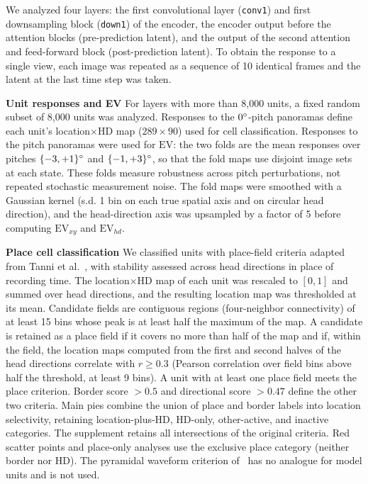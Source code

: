 \documentclass[11pt]{article}
\begin{document}
We analyzed four layers: the first convolutional layer (\texttt{conv1}) and first downsampling block (\texttt{down1}) of the encoder, the encoder output before the attention blocks (pre-prediction latent), and the output of the second attention and feed-forward block (post-prediction latent). To obtain the response to a single view, each image was repeated as a sequence of 10 identical frames and the latent at the last time step was taken.

{\bf Unit responses and EV}
For layers with more than 8,000 units, a fixed random subset of 8,000 units was analyzed. Responses to the $0\degree$-pitch panoramas define each unit's location$\times$HD map ($289\times90$) used for cell classification. Responses to the pitch panoramas were used for $\mathrm{EV}$: the two folds are the mean responses over pitches $\{-3,+1\}\degree$ and $\{-1,+3\}\degree$, so that the fold maps use disjoint image sets at each state. These folds measure robustness across pitch perturbations, not repeated stochastic measurement noise. The fold maps were smoothed with a Gaussian kernel (s.d. 1 bin on each true spatial axis and on circular head direction), and the head-direction axis was upsampled by a factor of 5 before computing $\mathrm{EV}_{xy}$ and $\mathrm{EV}_{hd}$.

{\bf Place cell classification}
We classified units with place-field criteria adapted from Tanni et al.~\cite{Tanni2022}, with stability assessed across head directions in place of recording time. The location$\times$HD map of each unit was rescaled to $[0,1]$ and summed over head directions, and the resulting location map was thresholded at its mean. Candidate fields are contiguous regions (four-neighbor connectivity) of at least 15 bins whose peak is at least half the maximum of the map. A candidate is retained as a place field if it covers no more than half of the map and if, within the field, the location maps computed from the first and second halves of the head directions correlate with $r \geq 0.3$ (Pearson correlation over field bins above half the threshold, at least 9 bins). A unit with at least one place field meets the place criterion. Border score $>0.5$ and directional score $>0.47$ define the other two criteria. Main pies combine the union of place and border labels into location selectivity, retaining location-plus-HD, HD-only, other-active, and inactive categories. The supplement retains all intersections of the original criteria. Red scatter points and place-only analyses use the exclusive place category (neither border nor HD). The pyramidal waveform criterion of~\cite{Tanni2022} has no analogue for model units and is not used.
\end{document}
